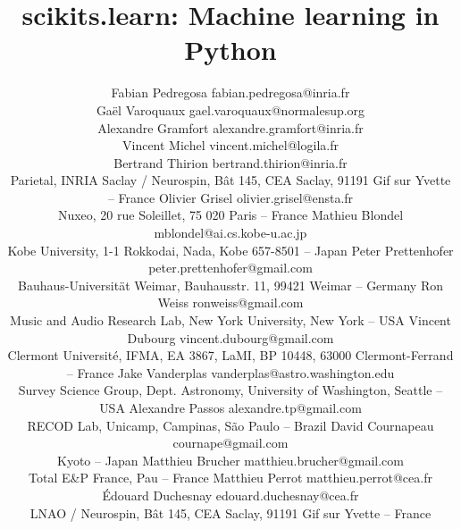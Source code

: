 \documentclass[twoside,11pt]{article}
\begin{document}
\title{scikits.learn: Machine learning in Python}


\author{\name Fabian Pedregosa \email fabian.pedregosa@inria.fr \\
        \name Ga\"el Varoquaux \email gael.varoquaux@normalesup.org  \\
        \name Alexandre Gramfort \email alexandre.gramfort@inria.fr \\
        \name Vincent Michel  \email vincent.michel@logila.fr \\
        \name Bertrand Thirion  \email bertrand.thirion@inria.fr \\
        \addr Parietal, INRIA Saclay / Neurospin,
      B\^at 145, CEA Saclay, 91191 Gif sur Yvette -- {\sc France}
        \AND
        \name Olivier Grisel \email olivier.grisel@ensta.fr \\
        \addr Nuxeo, 20 rue Soleillet, 75 020 Paris -- {\sc France} 
        \AND
        \name Mathieu Blondel \email mblondel@ai.cs.kobe-u.ac.jp \\
        \addr Kobe University, 1-1 Rokkodai, Nada, Kobe 657-8501 -- {\sc Japan}
        \AND
        \name Peter Prettenhofer \email peter.prettenhofer@gmail.com \\
        \addr Bauhaus-Universit\"at Weimar, Bauhausstr. 11, 99421 Weimar -- {\sc Germany}
        \AND
        \name Ron Weiss \email ronweiss@gmail.com \\
        \addr Music and Audio Research Lab, New York University, New York -- {\sc USA}
        \AND
        \name Vincent Dubourg \email vincent.dubourg@gmail.com\\
        \addr Clermont Universit\'e, IFMA, EA 3867, LaMI,
        BP 10448, 63000 Clermont-Ferrand -- {\sc France}
        \AND
        \name Jake Vanderplas \email vanderplas@astro.washington.edu\\
        \addr Survey Science Group, Dept. Astronomy, University of Washington, Seattle -- {\sc USA}
  \AND
        \name Alexandre Passos \email alexandre.tp@gmail.com \\
        \addr RECOD Lab,  Unicamp,  Campinas, S\~ao Paulo -- {\sc Brazil}
        \AND
        \name David Cournapeau \email cournape@gmail.com \\
        \addr Kyoto -- {\sc Japan}
        \AND
        \name Matthieu Brucher \email matthieu.brucher@gmail.com \\
        \addr Total E\&P France,  Pau -- {\sc France}
        \AND
        \name Matthieu Perrot \email matthieu.perrot@cea.fr\\
        \name \'Edouard Duchesnay \email edouard.duchesnay@cea.fr \\
        \addr LNAO / Neurospin,
      B\^at 145, CEA Saclay, 91191 Gif sur Yvette -- {\sc France}
}
\end{document}

